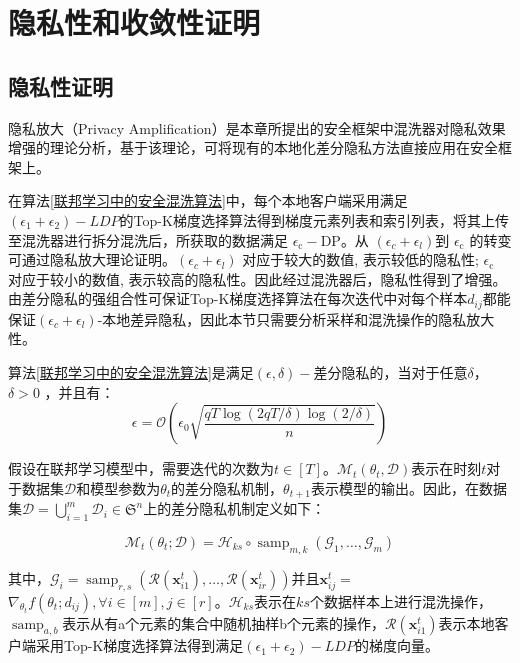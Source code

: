 \section{隐私性和收敛性证明}
\subsection{隐私性证明}
隐私放大（Privacy Amplification）是本章所提出的安全框架中混洗器对隐私效果增强的理论分析，基于该理论，可将现有的本地化差分隐私方法直接应用在安全框架上。

在算法\ref{联邦学习中的安全混洗算法}中，每个本地客户端采用满足$\left(\epsilon_{1}+\epsilon_{2}\right)-LDP$的Top-K梯度选择算法得到梯度元素列表和索引列表，将其上传至混洗器进行拆分混洗后，所获取的数据满足 $\epsilon_{\mathrm{c}}-\mathrm{DP}$。从 $\left(\epsilon_{c}+\epsilon_{l}\right)$到 $\epsilon_{\mathrm{c}}$ 的转变可通过隐私放大理论证明。$\left(\epsilon_{c}+\epsilon_{l}\right)$ 对应于较大的数值, 表示较低的隐私性; $\epsilon_{\mathrm{c}}$ 对应于较小的数值, 表示较高的隐私性。因此经过混洗器后，隐私性得到了增强。由差分隐私的强组合性可保证Top-K梯度选择算法在每次迭代中对每个样本$d_{i j}$都能保证$\left(\epsilon_{c}+\epsilon_{l}\right)$-本地差异隐私，因此本节只需要分析采样和混洗操作的隐私放大性。

\begin{theorem}\label{隐私性证明}
算法\ref{联邦学习中的安全混洗算法}是满足$(\epsilon, \delta)-$差分隐私的，当对于任意$\delta$，$\delta>0$ ，并且有：
$$
\epsilon=\mathcal{O}\left(\epsilon_{0} \sqrt{\frac{q T \log (2 q T / \delta) \log (2 / \delta)}{n}}\right)
$$
\end{theorem}

假设在联邦学习模型中，需要迭代的次数为$t \in[T]$。$\mathcal{M}_{t}\left(\theta_{t}, \mathcal{D}\right)$表示在时刻$t$对于数据集$\mathcal{D}$和模型参数为$\theta_{t}$的差分隐私机制，$\theta_{t+1}$表示模型的输出。因此，在数据集$\mathcal{D}=\bigcup_{i=1}^{m} \mathcal{D}_{i} \in \mathfrak{S}^{n}$上的差分隐私机制定义如下：

\begin{equation}\label{eq:隐私性证明机制}
\mathcal{M}_{t}\left(\theta_{t} ; \mathcal{D}\right)=\mathcal{H}_{k s} \circ \operatorname{samp}_{m, k}\left(\mathcal{G}_{1}, \ldots, \mathcal{G}_{m}\right)
\end{equation}

其中，$\mathcal{G}_{i}=\operatorname{samp}_{r, s}\left(\mathcal{R}\left(\boldsymbol{x}_{i 1}^{t}\right), \ldots, \mathcal{R}\left(\boldsymbol{x}_{i r}^{t}\right)\right)$并且$\boldsymbol{x}_{i j}^{t}=$$\nabla_{\theta_{t}} f\left(\theta_{t} ; d_{i j}\right), \forall i \in[m], j \in[r]$。$\mathcal{H}_{k s}$表示在$k s$个数据样本上进行混洗操作， $\operatorname{samp}_{a, b}$表示从有a个元素的集合中随机抽样b个元素的操作，$\mathcal{R}\left(\boldsymbol{x}_{i 1}^{t}\right)$表示本地客户端采用Top-K梯度选择算法得到满足$\left(\epsilon_{1}+\epsilon_{2}\right)-LDP$的梯度向量。

